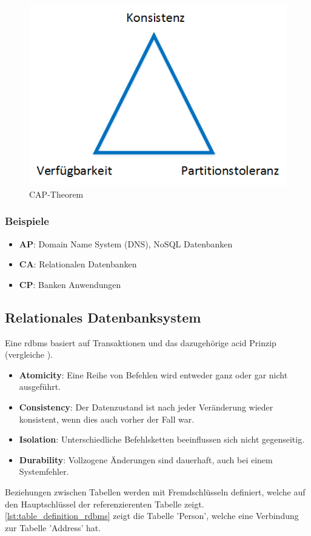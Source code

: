 \begin{figure}[h]
\centering
\includegraphics[scale=0.8]{images/visio/cap.png}
\caption[CAP-Theorem]{CAP-Theorem \selfmade{}}
\label{fig:cap}
\end{figure}

\subsubsection{Beispiele}

\begin{itemize}
	\item \textbf{AP}: Domain Name System (DNS), NoSQL Datenbanken
	\item \textbf{CA}: Relationalen Datenbanken
	\item \textbf{CP}: Banken Anwendungen
\end{itemize}

\subsection{Relationales Datenbanksystem}\label{rdbms}
Eine \gls{rdbms} basiert auf Transaktionen und das dazugehörige \gls{acid} Prinzip (vergleiche \cite{limited2010introduction}). 
\begin{itemize}
	\item \textbf{Atomicity}: Eine Reihe von Befehlen wird entweder ganz oder gar nicht ausgeführt.
	\item \textbf{Consistency}: Der Datenzustand ist nach jeder Veränderung wieder konsistent, wenn dies auch vorher der Fall war.
	\item \textbf{Isolation}: Unterschiedliche Befehlsketten beeinflussen sich nicht gegenseitig.
	\item \textbf{Durability}: Vollzogene Änderungen sind dauerhaft, auch bei einem Systemfehler.
\end{itemize}
Beziehungen zwischen Tabellen werden mit Fremdschlüsseln definiert, welche auf den Hauptschlüssel der referenzierenten Tabelle zeigt. \autoref{lst:table_definition_rdbms} zeigt die
Tabelle 'Person', welche eine Verbindung zur Tabelle 'Address' hat.

